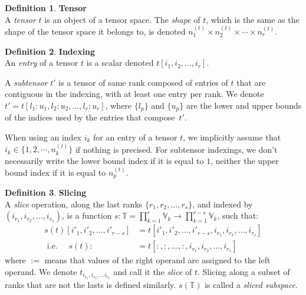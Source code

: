 \documentclass{article}
\theoremstyle{definition}
\newtheorem{definition}{Definition}[section]
\newcommand{\tspace}{\mathbb{T}}
\newcommand{\vecspace}{\mathbb{V}}
\begin{document}
\begin{definition}\textbf{Tensor}\\
A \emph{tensor} $t$ is an object of a tensor space. The \emph{shape} of $t$, which is the same as the shape of the tensor space it belongs to, is denoted $n_1^{(t)} \times n_2^{(t)} \times \cdots \times n_r^{(t)}$.
\end{definition}

\begin{definition}\textbf{Indexing}\\
An \emph{entry} of a tensor $t$ is a scalar denoted $t[i_1, i_2, \ldots, i_r]$.

A \emph{subtensor} $t'$ is a tensor of same rank composed of entries of $t$ that are contiguous in the indexing, with at least one entry per rank. We denote $t' = t[l_1{:}u_1, l_2{:}u_2, \ldots, l_r{:}u_r]$, where $\{l_p\}$ and $\{u_p\}$ are the lower and upper bounds of the indices used by the entries that compose~$t'$.
\end{definition}

When using an index $i_k$ for an entry of a tensor $t$, we implicitly assume that $i_k \in \{1, 2, \cdots, n_k^{(t)}\}$ if nothing is precised.
For subtensor indexings, we don't necessarily write the lower bound index if it is equal to $1$, neither the upper bound index if it is equal to $n_p^{(t)}$.

\begin{definition}\textbf{Slicing}\\
A \emph{slice} operation, along the last ranks $\{r_1, r_2, \ldots, r_s\}$, and indexed by $(i_{r_1}, i_{r_2}, \ldots, i_{r_s})$, is a function $s: \tspace = \displaystyle \prod_{k=1}^r \vecspace_k \rightarrow \prod_{k=1}^{r-s} \vecspace_k$, such that:
\begin{align*}
s(t)[i'_1, i'_2, \ldots, i'_{r-s}] &= t[i'_1, i'_2, \ldots, i'_{r-s}, i_{r_1}, i_{r_2}, \ldots, i_{r_s}] \\
\text{ i.e. } \quad s(t) :&= t[:,:, \ldots, :, i_{r_1}, i_{r_2}, \ldots, i_{r_s}]
\end{align*}
where $:=$ means that values of the right operand are assigned to the left operand.
We denote $t_{i_{r_1}, i_{r_2}, \ldots i_{r_s}}$ and call it the \emph{slice} of $t$. 
Slicing along a subset of ranks that are not the lasts is defined similarly.
$s(\tspace)$ is called a \emph{sliced subspace}.
\end{definition}
\end{document}
